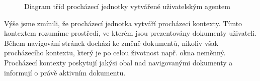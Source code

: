 \begin{figure}[H]
  \begin{center}
    \caption{Diagram tříd procházecí jednotky vytvářené uživatelským agentem}
    \label{Figure.UserAgentAndBrowsingUnit}
  \end{center}
\end{figure}

Výše jsme zmínili, že procházecí jednotka vytváří procházecí kontexty. Tímto kontextem rozumíme prostředí, ve kterém jsou prezentovány dokumenty uživateli. Během navigování stránek dochází ke změně dokumentů, nikoliv však procházecího kontextu, který je po celou životnost např. okna neměnný. Procházecí kontexty poskytují jakýsi obal nad navigovanými dokumenty a informují o právě aktivním dokumentu.

